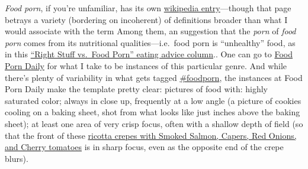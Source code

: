 \documentclass[
  12pt,
]{article}
\begin{document}
\emph{Food porn}, if you're unfamiliar, has its own
\href{http://en.wikipedia.org/wiki/Food_porn}{wikipedia entry}---though
that page betrays a variety (bordering on incoherent) of definitions
broader than what I would associate with the term {Among them, an
suggestion that the \emph{porn} of \emph{food porn} comes from its
nutritional qualities---i.e.~food porn is ``unhealthy'' food, as in this
\href{http://www.cspinet.org/nah/april98back.htm}{``Right Stuff vs.~Food
Porn'' eating advice column}.}. One can go to
\href{http://foodporndaily.com/}{Food Porn Daily} for what I take to be
instances of this particular genre. And while there's plenty of
variability in what gets tagged
\href{https://twitter.com/search?q=\%23foodporn}{\#foodporn}, the
instances at Food Porn Daily make the template pretty clear: pictures of
food with: highly saturated color; always in close up, frequently at a
low angle (a picture of cookies cooling on a baking sheet, shot from
what looks like just inches above the baking sheet); at least one area
of very crisp focus, often with a shallow depth of field (so that the
front of these
\href{http://foodporndaily.com/pictures/ricotta-crepes-with-smoked-salmon-capers-red-onions-and-cherry-tomatoes/}{ricotta
crepes with Smoked Salmon, Capers, Red Onions, and Cherry tomatoes} is
in sharp focus, even as the opposite end of the crepe blurs).
\end{document}
